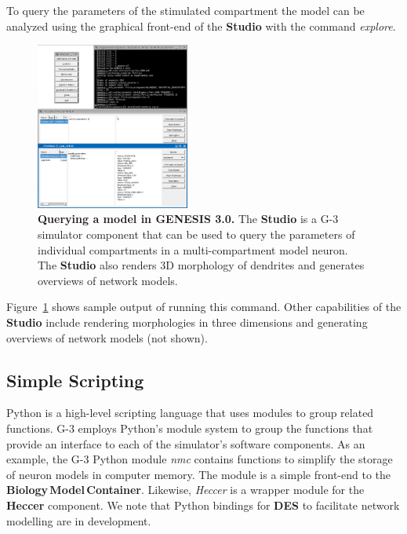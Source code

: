 \documentclass[11pt,3p,twocolumn]{JMN}
\begin{document}
To query the parameters of the stimulated compartment the model can  be analyzed using the graphical front-end of the {\bf Studio}
with the command {\it explore}.

\begin{figure}[h!]
  \begin{center}
    \includegraphics[width=0.45\textwidth]{figures/studio-screenshot.eps}
  \end{center}
  \caption{ \small{{\bf Querying a model in GENESIS 3.0.} The {\bf Studio} is a G-3 simulator component that can be used to query the parameters of individual compartments in a multi-compartment model neuron. The {\bf Studio} also renders 3D morphology of dendrites and generates overviews of network models.
  }}
  \label{fig:cbi-studio}
\end{figure}

Figure~\ref{fig:cbi-studio} shows sample output of running this command.  Other capabilities of the {\bf Studio} include rendering morphologies in three dimensions and generating overviews of network models (not shown). 


\subsection{Simple Scripting}
\label{ss-apens}

Python is a high-level scripting language that uses modules to group related functions.  G-3 employs Python's module system to group the functions that provide an interface to each of the simulator's software components.
As an example, the G-3 Python module {\it nmc} contains functions to simplify the storage of neuron models in computer memory.  The module is a simple front-end to the {\bf Biology\,Model\,Container}. Likewise, {\it Heccer} is a wrapper module for the {\bf Heccer} component.  We note that Python bindings for {\bf DES} to facilitate network modelling are in development.
\end{document}
